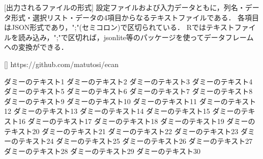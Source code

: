 \documentclass[11pt]{jsarticle}
\begin{document}
[出力されるファイルの形式]
設定ファイルおよび入力データともに，列名・データ形式・選択リスト・データの4項目からなるテキストファイルである．
各項目はJSON形式であり，";"(セミコロン)で区切られている．
Rではテキストファイルを読み込み，";"で区切れば，jsonlite等のパッケージを使ってデータフレームへの変換ができる．

[]
https://github.com/matutosi/ecan

ダミーのテキスト1
ダミーのテキスト2
ダミーのテキスト3
ダミーのテキスト4
ダミーのテキスト5
ダミーのテキスト6
ダミーのテキスト7
ダミーのテキスト8
ダミーのテキスト9
ダミーのテキスト10
ダミーのテキスト11
ダミーのテキスト12
ダミーのテキスト13
ダミーのテキスト14
ダミーのテキスト15
ダミーのテキスト16
ダミーのテキスト17
ダミーのテキスト18
ダミーのテキスト19
ダミーのテキスト20
ダミーのテキスト21
ダミーのテキスト22
ダミーのテキスト23
ダミーのテキスト24
ダミーのテキスト25
ダミーのテキスト26
ダミーのテキスト27
ダミーのテキスト28
ダミーのテキスト29
ダミーのテキスト30
\end{document}
